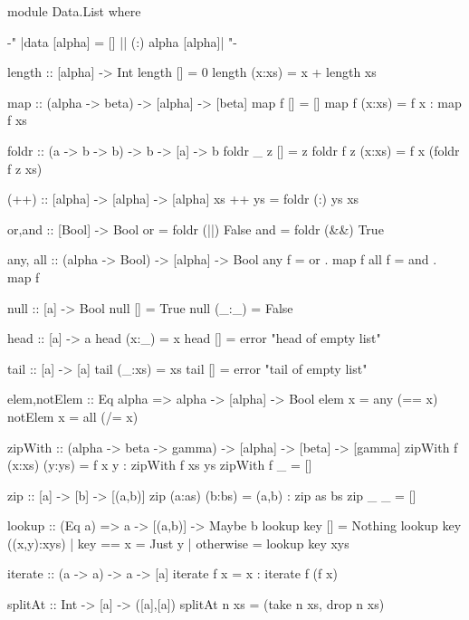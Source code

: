 \begin{code}
module Data.List where

{-" |data [alpha] = [] || (:) alpha [alpha]| "-}

length :: [alpha] -> Int
length []      = 0
length (x:xs)  = x + length xs

map :: (alpha -> beta) -> [alpha] -> [beta]
map f []      = []
map f (x:xs)  = f x : map f xs

foldr            :: (a -> b -> b) -> b -> [a] -> b
foldr _ z []     =  z
foldr f z (x:xs) =  f x (foldr f z xs)

(++) :: [alpha] -> [alpha] -> [alpha]
xs ++ ys = foldr (:) ys xs

or,and :: [Bool] -> Bool
or                      =  foldr (||) False
and                     =  foldr (&&) True

any, all :: (alpha -> Bool) -> [alpha] -> Bool
any  f = or   . map f
all  f = and  . map f

null                    :: [a] -> Bool
null []                 =  True
null (_:_)              =  False

head                    :: [a] -> a
head (x:_)              =  x
head []                 =  error "head of empty list"

tail                    :: [a] -> [a]
tail (_:xs)             =  xs
tail []                 =  error "tail of empty list"

elem,notElem :: Eq alpha => alpha -> [alpha] -> Bool
elem x = any (== x)
notElem x = all (/= x)

zipWith :: (alpha -> beta -> gamma) -> [alpha] -> [beta] -> [gamma]
zipWith f (x:xs) (y:ys) = f x y : zipWith f xs ys
zipWith f _ = []

zip :: [a] -> [b] -> [(a,b)]
zip (a:as) (b:bs) = (a,b) : zip as bs
zip _      _      = []

lookup :: (Eq a) => a -> [(a,b)] -> Maybe b
lookup key []           =  Nothing
lookup key ((x,y):xys)  | key == x   = Just y
                        | otherwise  = lookup key xys

iterate :: (a -> a) -> a -> [a]
iterate f x =  x : iterate f (f x)

splitAt                :: Int -> [a] -> ([a],[a])
splitAt n xs           =  (take n xs, drop n xs)


\end{code}
